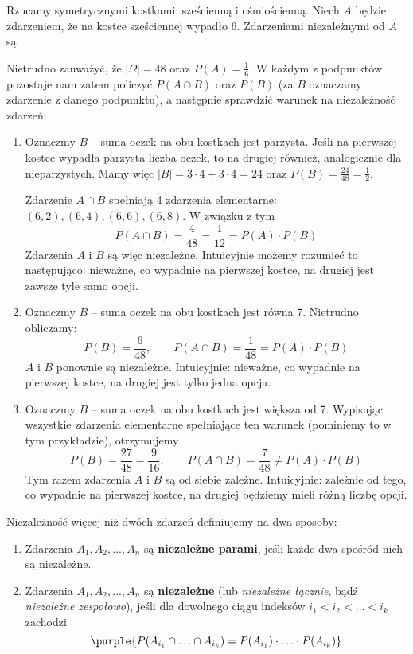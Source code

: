 \begin{exam}
    Rzucamy symetrycznymi kostkami: sześcienną i ośmiościenną. Niech $A$ będzie zdarzeniem, że na kostce sześciennej wypadło $6$. Zdarzeniami niezależnymi od $A$ są
    \bigskip

    Nietrudno zauważyć, że $|\Omega| = 48$ oraz $P(A) = \frac{1}{6}$. W każdym z podpunktów pozostaje nam zatem policzyć $P(A \cap B)$ oraz $P(B)$ (za $B$ oznaczamy zdarzenie z danego podpunktu), a następnie sprawdzić warunek na niezależność zdarzeń.
    \begin{enumerate}[\bf A.]
        \item Oznaczmy $B$ -- suma oczek na obu kostkach jest parzysta. Jeśli na pierwszej kostce wypadła parzysta liczba oczek, to na drugiej również, analogicznie dla nieparzystych. Mamy więc $|B| = 3 \cdot 4 + 3 \cdot 4 = 24$ oraz $P(B) = \frac{24}{48} = \frac{1}{2}$.
        
        Zdarzenie $A \cap B$ spełniają 4 zdarzenia elementarne: $(6, 2), (6, 4), (6, 6), (6, 8)$. W związku z tym
        $$P(A \cap B) = \frac{4}{48} = \frac{1}{12} = P(A) \cdot P(B)$$
        Zdarzenia $A$ i $B$ są więc niezależne. Intuicyjnie możemy rozumieć to następująco: nieważne, co wypadnie na pierwszej kostce, na drugiej jest zawsze tyle samo opcji.

        \item Oznaczmy $B$ -- suma oczek na obu kostkach jest równa 7. Nietrudno obliczamy:
        $$P(B) = \frac{6}{48}, \qquad P(A \cap B) = \frac{1}{48} = P(A) \cdot P(B)$$
        $A$ i $B$ ponownie są niezależne. Intuicyjnie: nieważne, co wypadnie na pierwszej kostce, na drugiej jest tylko jedna opcja.

        \item Oznaczmy $B$ -- suma oczek na obu kostkach jest większa od 7. Wypisując wszystkie zdarzenia elementarne spełniające ten warunek (pominiemy to w tym przykładzie), otrzymujemy
        $$P(B) = \frac{27}{48} = \frac{9}{16}, \qquad P(A \cap B) = \frac{7}{48} \neq P(A) \cdot P(B)$$
        Tym razem zdarzenia $A$ i $B$ są od siebie zależne. Intuicyjnie: zależnie od tego, co wypadnie na pierwszej kostce, na drugiej będziemy mieli różną liczbę opcji.
    \end{enumerate}
\end{exam}

Niezależność więcej niż dwóch zdarzeń definiujemy na dwa sposoby:
\begin{enumerate}
    \item Zdarzenia $A_1, A_2, ..., A_n$ są \textbf{niezależne parami}, jeśli każde dwa spośród nich są niezależne.

    \item Zdarzenia $A_1, A_2, ..., A_n$ są \textbf{niezależne} (lub \textit{niezależne łącznie}, bądź \textit{niezależne zespołowo}), jeśli dla dowolnego ciągu indeksów $i_1<i_2<\ldots<i_k$ zachodzi $$\purple{P(A_{i_1}\cap\ldots\cap A_{i_k})=P(A_{i_1})\cdot\ldots\cdot P(A_{i_k})}$$
\end{enumerate}

